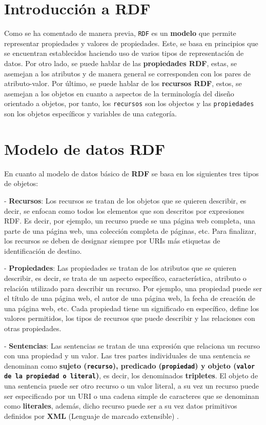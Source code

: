 \documentclass[11pt]{report}
\begin{document}
	\section{Introducción a RDF}

  Como se ha comentado de manera previa, \texttt{RDF} es un \textbf{modelo} que permite representar propiedades y valores de propiedades. Este, se basa en principios que se encuentran establecidos haciendo uso de varios tipos de representación de datos. Por otro lado, se puede hablar de las \textbf{propiedades RDF}, estas, se asemejan a los atributos y de manera general se corresponden con los pares de atributo-valor. Por último, se puede hablar de los \textbf{recursos RDF}, estos, se asemejan a los objetos en cuanto a aspectos de la terminología del diseño orientado a objetos, por tanto, los \texttt{recursos} son los objectos y las \texttt{propiedades} son los objetos específicos y variables de una categoría.

	\section{Modelo de datos RDF}

	En cuanto al modelo de datos básico de \textbf{RDF} se basa en los siguientes tres tipos de objetos:

	- \textbf{Recursos}: Los recursos se tratan de los objetos que se quieren describir, es decir, se enfocan como todos los elementos que son descritos por expresiones RDF. Es decir, por ejemplo, un recurso puede se una página web completa, una parte de una página web, una colección completa de páginas, etc. Para finalizar, los recursos se deben de designar siempre por URIs más etiquetas de identificación de destino.

	- \textbf{Propiedades}: Las propiedades se tratan de los atributos que se quieren describir, es decir, se trata de un aspecto específico, característica, atributo o relación utilizado para describir un recurso. Por ejemplo, una propiedad puede ser el título de una página web, el autor de una página web, la fecha de creación de una página web, etc.  Cada propiedad tiene un significado en específico, define los valores permitidos, los tipos de recursos que puede describir y las relaciones con otras propiedades.

	- \textbf{Sentencias}: Las sentencias se tratan de una expresión que relaciona un recurso con una propiedad y un valor. Las tres partes individuales de una sentencia se denominan como \textbf{sujeto (\texttt{recurso}), predicado (\texttt{propiedad}) y objeto (\texttt{valor de la propiedad o literal})}, es decir, los denominados \textbf{tripletes}. El objeto de una sentencia puede ser otro recurso o un valor literal, a su vez un recurso puede ser especificado por un URI o una cadena simple de caracteres que se denominan como \textbf{literales}, además, dicho recurso puede ser a su vez datos primitivos definidos por \textbf{XML} (Lenguaje de marcado extensible) \cite{6}. 
\end{document}

